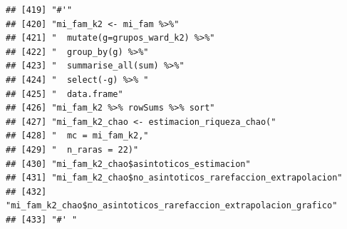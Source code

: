 \documentclass[11pt,]{article}
\begin{document}
\begin{verbatim}
## [419] "#'"                                                                                                                                                                    
## [420] "mi_fam_k2 <- mi_fam %>%"                                                                                                                                               
## [421] "  mutate(g=grupos_ward_k2) %>%"                                                                                                                                        
## [422] "  group_by(g) %>%"                                                                                                                                                     
## [423] "  summarise_all(sum) %>%"                                                                                                                                              
## [424] "  select(-g) %>% "                                                                                                                                                     
## [425] "  data.frame"                                                                                                                                                          
## [426] "mi_fam_k2 %>% rowSums %>% sort"                                                                                                                                        
## [427] "mi_fam_k2_chao <- estimacion_riqueza_chao("                                                                                                                            
## [428] "  mc = mi_fam_k2,"                                                                                                                                                     
## [429] "  n_raras = 22)"                                                                                                                                                       
## [430] "mi_fam_k2_chao$asintoticos_estimacion"                                                                                                                                 
## [431] "mi_fam_k2_chao$no_asintoticos_rarefaccion_extrapolacion"                                                                                                               
## [432] "mi_fam_k2_chao$no_asintoticos_rarefaccion_extrapolacion_grafico"                                                                                                       
## [433] "#' "                                                                                                                                                                   

\end{verbatim}
\end{document}
